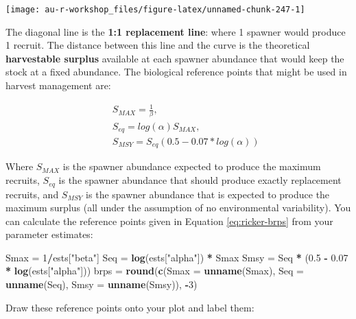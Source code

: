 \documentclass[]{book}
\newenvironment{Shaded}{\begin{snugshade}}{\end{snugshade}}
\newcommand{\KeywordTok}[1]{\textcolor[rgb]{0.13,0.29,0.53}{\textbf{#1}}}
\newcommand{\DataTypeTok}[1]{\textcolor[rgb]{0.13,0.29,0.53}{#1}}
\newcommand{\DecValTok}[1]{\textcolor[rgb]{0.00,0.00,0.81}{#1}}
\newcommand{\FloatTok}[1]{\textcolor[rgb]{0.00,0.00,0.81}{#1}}
\newcommand{\StringTok}[1]{\textcolor[rgb]{0.31,0.60,0.02}{#1}}
\newcommand{\OperatorTok}[1]{\textcolor[rgb]{0.81,0.36,0.00}{\textbf{#1}}}
\newcommand{\NormalTok}[1]{#1}
\theoremstyle{definition}
\theoremstyle{definition}
\theoremstyle{definition}
\theoremstyle{remark}
\begin{document}
\begin{center}\texttt{[image: au-r-workshop\_files/figure-latex/unnamed-chunk-247-1]} \end{center}

The diagonal line is the \textbf{1:1 replacement line}: where 1 spawner
would produce 1 recruit. The distance between this line and the curve is
the theoretical \textbf{harvestable surplus} available at each spawner
abundance that would keep the stock at a fixed abundance. The biological
reference points that might be used in harvest management are:

\begin{eqnarray*}
&& S_{MAX}=\frac{1}{\beta},\\
&& S_{eq}=log(\alpha) S_{MAX},\\
&& S_{MSY}=S_{eq} \left(0.5-0.07*log(\alpha)\right)
\label{eq:ricker-brps}
\end{eqnarray*}

Where \(S_{MAX}\) is the spawner abundance expected to produce the
maximum recruits, \(S_{eq}\) is the spawner abundance that should
produce exactly replacement recruits, and \(S_{MSY}\) is the spawner
abundance that is expected to produce the maximum surplus (all under the
assumption of no environmental variability). You can calculate the
reference points given in Equation \eqref{eq:ricker-brps} from your
parameter estimates:

\begin{Shaded}
\begin{Highlighting}[]
\NormalTok{Smax =}\StringTok{ }\DecValTok{1}\OperatorTok{/}\NormalTok{ests[}\StringTok{"beta"}\NormalTok{]}
\NormalTok{Seq =}\StringTok{ }\KeywordTok{log}\NormalTok{(ests[}\StringTok{"alpha"}\NormalTok{]) }\OperatorTok{*}\StringTok{ }\NormalTok{Smax}
\NormalTok{Smsy =}\StringTok{ }\NormalTok{Seq }\OperatorTok{*}\StringTok{ }\NormalTok{(}\FloatTok{0.5} \OperatorTok{-}\StringTok{ }\FloatTok{0.07} \OperatorTok{*}\StringTok{ }\KeywordTok{log}\NormalTok{(ests[}\StringTok{"alpha"}\NormalTok{]))}
\NormalTok{brps =}\StringTok{ }\KeywordTok{round}\NormalTok{(}\KeywordTok{c}\NormalTok{(}\DataTypeTok{Smax =} \KeywordTok{unname}\NormalTok{(Smax),}
               \DataTypeTok{Seq =} \KeywordTok{unname}\NormalTok{(Seq),}
               \DataTypeTok{Smsy =} \KeywordTok{unname}\NormalTok{(Smsy)), }\OperatorTok{-}\DecValTok{3}\NormalTok{)}
\end{Highlighting}
\end{Shaded}

Draw these reference points onto your plot and label them:
\end{document}
